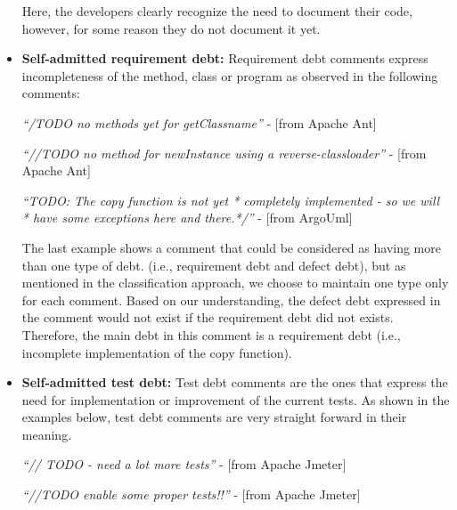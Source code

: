 \begin{itemize}
  Here, the developers clearly recognize the need to document their code, however, for some reason they do not document it yet.
  
  \item \textbf{Self-admitted requirement debt:} Requirement debt comments express incompleteness of the method, class or program as observed in the following comments:
  
  \begin{displayquote}
  	\textit{``/TODO no methods yet for getClassname''} - [from Apache Ant]
  	
  	\vspace{1mm}
  	
  	\textit{``//TODO no method for newInstance using a reverse-classloader''} - [from Apache Ant]

  	\vspace{1mm}
  	
  	\textit{``TODO: The copy function is not yet * completely implemented - so we will  * have some exceptions here and there.*/''} - [from ArgoUml]  
  	
  \end{displayquote}
  \vspace{1mm}  
  
The last example shows a comment that could be considered as having more than one type of debt. (i.e., requirement debt and defect debt), but as mentioned in the classification approach, we choose to maintain one type only for each comment. Based on our understanding, the defect debt expressed in the comment would not exist if the requirement debt did not exists. Therefore, the main debt in this comment is a requirement debt (i.e., incomplete implementation of the copy function). 
  	
  
  \vspace{1mm}
  \item \textbf{Self-admitted test debt:} Test debt comments are the ones that express the need for implementation or improvement of the current tests. As shown in the examples below, test debt comments are very straight forward in their meaning. 
  
  \begin{displayquote}
  	\textit{``// TODO - need a lot more tests''} - [from Apache Jmeter]
  	
  	\vspace{1mm}
  	
  	\textit{``//TODO enable some proper tests!!''} - [from Apache Jmeter]
  \end{displayquote}
  \vspace{1mm}  
    
\end{itemize}

